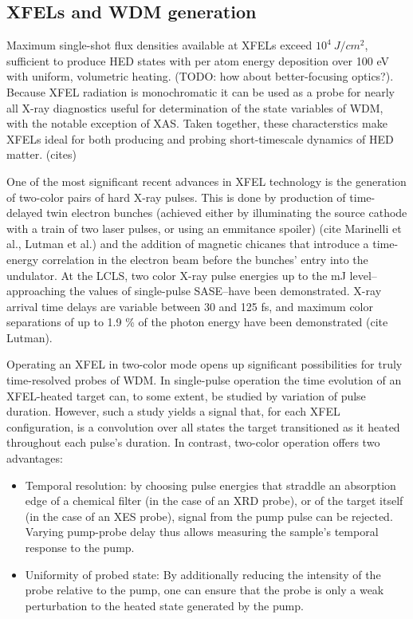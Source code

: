 \documentclass [11pt, proquest, article] {uwthesis}[2016/11/22]
\begin{document}


\subsection{XFELs and WDM generation}
Maximum single-shot flux densities available at XFELs exceed $10^4~J/cm^2$, sufficient to produce HED states with per atom energy deposition over 100 eV with uniform, volumetric heating. (TODO: how about better-focusing optics?). Because XFEL radiation is monochromatic it can be used as a probe for nearly all X-ray diagnostics useful for determination of the state variables of WDM, with the notable exception of XAS.  Taken together, these characterstics make XFELs ideal for both producing and probing short-timescale dynamics of HED matter. (cites)

One of the most significant recent advances in XFEL technology is the generation of two-color pairs of hard X-ray pulses. This is done by production of time-delayed twin electron bunches (achieved either by illuminating the source cathode with a train of two laser pulses, or using an emmitance spoiler) (cite Marinelli et al., Lutman et al.) and the addition of magnetic chicanes that introduce a time-energy correlation in the electron beam before the bunches' entry into the undulator. At the LCLS, two color X-ray pulse energies up to the mJ level--approaching the values of single-pulse SASE--have been demonstrated. X-ray arrival time delays are variable between 30 and 125 fs, and maximum color separations of up to 1.9 \% of the photon energy have been demonstrated (cite Lutman).

Operating an XFEL in two-color mode opens up significant possibilities for truly time-resolved probes of WDM. In single-pulse operation the time evolution of an XFEL-heated target can, to some extent, be studied by variation of pulse duration. However, such a study yields a signal that, for each XFEL configuration, is a convolution over all states the target transitioned as it heated throughout each pulse's duration. In contrast, two-color operation offers two advantages:

\begin{itemize}
\item{Temporal resolution: by choosing pulse energies that straddle an absorption edge of a chemical filter (in the case of an XRD probe), or of the target itself (in the case of an XES probe), signal from the pump pulse can be rejected. Varying pump-probe delay thus allows measuring the sample's temporal response to the pump.}
\item{Uniformity of probed state: By additionally reducing the intensity of the probe relative to the pump, one can ensure that the probe is only a weak perturbation to the heated state generated by the pump.}
\end{itemize}
\end{document}
